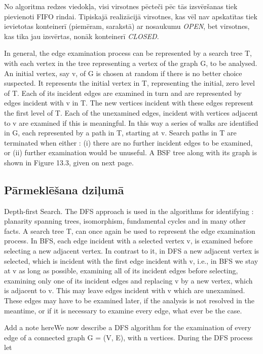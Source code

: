 No algoritma redzes viedokļa, visi virsotnes pēcteči pēc tās izsvēršanas tiek
pievienoti FIFO  rindai. Tipiskajā realizācijā 
virsotnes, kas vēl nav apskatītas tiek ievietotas konteinerī (piemēram, sarakstā)
ar nosaukumu \emph{OPEN}, bet virsotnes, kas tika jau izsvērtas, nonāk konteinerī
\emph{CLOSED}.

In general, the edge examination process can be represented by a search tree T, with each vertex in the tree representing a vertex of the graph G, to be analysed. An initial vertex, say v, of G is chosen at random if there is no better choice suspected. It represents the initial vertex in T, representing the initial, zero level of T. Each of its incident edges are examined in turn and are represented by edges incident with v in T. The new vertices incident with these edges represent the first level of T. Each of the unexamined edges, incident with vertices adjacent to v are examined if this is meaningful. In this way a series of walks are identified in G, each represented by a path in T, starting at v. Search paths in T are terminated when either : (i) there are no further incident edges to be examined, or (ii) further examination would be unuseful. A BSF tree along with its graph is shown in Figure 13.3, given on next page.

\subsection{Pārmeklēšana dziļumā}
Depth-first Search. The DFS approach is used in the algorithms for identifying : planarity spanning trees, isomorphism, fundamental cycles and in many other facts. A search tree T, can once again be used to represent the edge examination process. In BFS, each edge incident with a selected vertex v, is examined before selecting a new adjacent vertex. In contrast to it, in DFS a new adjacent vertex is selected, which is incident with the first edge incident with v, i.e., in BFS we stay at v as long as possible, examining all of its incident edges before selecting, examining only one of its incident edges and replacing v by a new vertex, which is adjacent to v. This may leave edges incident with v which are unexamined. These edges may have to be examined later, if the analysis is not resolved in the meantime, or if it is necessary to examine every edge, what ever be the case.

Add a note hereWe now describe a DFS algorithm for the examination of every edge of a connected graph G = (V, E), with n vertices. During the DFS process let

